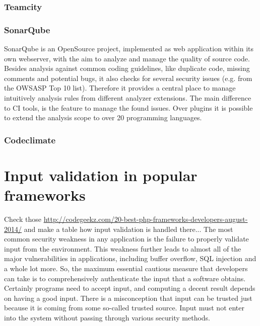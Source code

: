 \documentclass[conference]{IEEEtran}
\begin{document}
\subsubsection{Teamcity}
\label{subsubsec:teamcity}



\subsubsection{SonarQube}
\label{subsubsec:sonarqube}
SonarQube is an OpenSource project, implemented as web application within its own webserver, with the aim to analyze and manage the quality of source code. 
Besides analysis against common coding guidelines, like duplicate code, missing comments and potential bugs, it also checks for several security issues (e.g. from the OWSASP Top 10 list).
Therefore it provides a central place to manage intuitively analysis rules from different analyzer extensions.
The main difference to CI tools, is the feature to manage the found issues.
Over plugins it is possible to extend the analysis scope to over 20 programming languages.


\subsubsection{Codeclimate}
\label{subsubsec:codeclimate}



\section{Input validation in popular frameworks}
\label{sec:input_validation}
Check those \url{http://codegeekz.com/20-best-php-frameworks-developers-august-2014/} and make a table how input validation is handled there...
The most common security weakness in any application is the failure to properly validate input from the environment. This weakness further leads to almost all of the major vulnerabilities in applications, including buffer overflow, SQL injection and a whole lot more. So, the maximum essential cautious measure that developers can take is to comprehensively authenticate the input that a software obtains. Certainly programs need to accept input, and computing a decent result depends on having a good input. There is a misconception that input can be trusted just because it is coming from some so-called trusted source. Input must not enter into the system without passing through various security methods.
\end{document}
